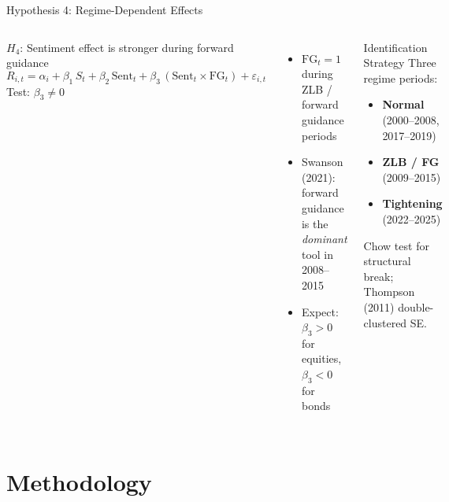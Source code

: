 \documentclass[aspectratio=169, 11pt]{beamer}
\begin{document}
\begin{frame}{Hypothesis 4: Regime-Dependent Effects}
  \begin{columns}[T]
    \begin{ablock}{$H_4$: Sentiment effect is stronger during forward guidance}
      \begin{equation}
        R_{i,t} = \alpha_i + \beta_1\, S_t + \beta_2\, \mathrm{Sent}_t + \beta_3\, (\mathrm{Sent}_t \times \mathrm{FG}_t) + \varepsilon_{i,t}
      \end{equation}
      Test: $\beta_3 \neq 0$
    \end{ablock}

    \begin{itemize}
      \item<2-> $\mathrm{FG}_t = 1$ during ZLB / forward guidance periods
      \item<3-> Swanson (2021): forward guidance is the \emph{dominant} tool in 2008--2015
      \item<4-> Expect: $\beta_3 > 0$ for equities, $\beta_3 < 0$ for bonds
    \end{itemize}

    \begin{agreenblock}{Identification Strategy}
      \footnotesize
      Three regime periods:
      \begin{itemize}
        \item \textbf{Normal} (2000--2008, 2017--2019)
        \item \textbf{ZLB / FG} (2009--2015)
        \item \textbf{Tightening} (2022--2025)
      \end{itemize}
      Chow test for structural break; \\
      Thompson (2011) double-clustered SE.
    \end{agreenblock}
  \end{columns}
\end{frame}

\section{Methodology}
\end{document}
